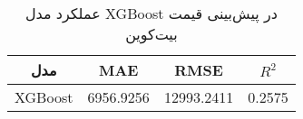 
        \begin{table}[h]
            \centering
            \begin{tabular}{cccc}
                \toprule
                \textbf{مدل} & \textbf{MAE} & \textbf{RMSE} & \textbf{ \(R^2\) } \\
                \midrule
                XGBoost & 6956.9256 & 12993.2411 & 0.2575 \\
                \bottomrule
            \end{tabular}
            \caption{عملکرد مدل XGBoost در پیش‌بینی قیمت بیت‌کوین}
            \label{tab:xgboost_performance}
        \end{table}
        